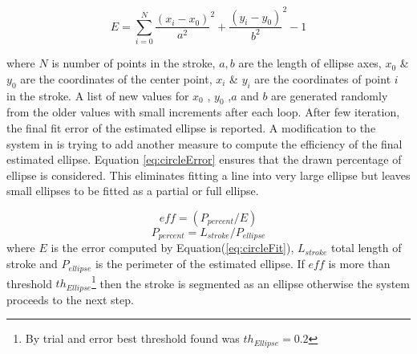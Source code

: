 \documentclass[10pt]{article}
\begin{document}
\begin{equation}
E = \sum\limits_{i = 0}^N {\frac{{(x_i - x_0 )}}{{a^2 }}^2  + \frac{{(y_i - y_0 )}}{{b^2 }}^2  - 1} 
\label{eq:circleFit}
\end{equation}

 where $N$ is number of points in the stroke, $a,b$ are the length of ellipse axes, $x_0$ \& $y_0$ are the coordinates of the center point, $x_i$ \& $y_i$ are the coordinates of point $i$ in the stroke. A list of new values for $x_0$ , $y_0$ ,$a$ and $b$ are generated randomly from the older values with small increments after each loop.  After few iteration, the final fit error of the estimated ellipse is reported. A modification to the system in \cite{mypaper} is trying to add another measure to compute the efficiency of the final estimated ellipse. Equation \ref{eq:circleError} ensures that the drawn percentage of ellipse is considered. This eliminates fitting a line into very large ellipse but leaves small ellipses to be fitted as a partial or full ellipse. 

 \begin{equation}
eff= (P_{percent}/E)
\label{eq:circleError}
\end{equation}
 \begin{equation}
P_{percent}  = L_{stroke} /P_{ellipse} 
\label{eq:ErrorArea}
\end{equation}
where $E$ is the error computed by Equation(\ref{eq:circleFit}), $L_{stroke}$ total length of stroke and $P_{ellipse} $ is the perimeter of the estimated ellipse. If $eff$ is more than threshold $th_{Ellipse}$\footnote{By trial and error best threshold found was $th_{Ellipse}=0.2$} then the stroke is segmented as an ellipse otherwise the system proceeds to the next step. 
\end{document}
